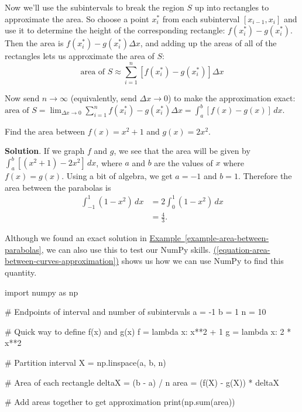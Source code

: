 \documentclass[10pt,]{book}
\theoremstyle{ptxplainnotitle}
\theoremstyle{ptxplaintitle}
\theoremstyle{ptxplainnotitle}
\theoremstyle{ptxplaintitle}
\theoremstyle{ptxplainnotitle}
\theoremstyle{ptxplaintitle}
\theoremstyle{ptxdefinitionnotitle}
\theoremstyle{ptxdefinitiontitle}
\theoremstyle{ptxdefinitionnotitle}
\theoremstyle{ptxdefinitiontitle}
\theoremstyle{ptxdefinitionnotitle}
\theoremstyle{ptxdefinitiontitle}
\theoremstyle{ptxdefinitionnotitle}
\theoremstyle{ptxdefinitiontitle}
\theoremstyle{ptxdefinitionnotitle}
\theoremstyle{ptxdefinitiontitle}
\numberwithin{equation}{section}
\begin{document}
\hypertarget{p-615}{}%
Now we'll use the subintervals to break the region \(S\) up into rectangles to approximate the area. So choose a point \(x_{i}^{*}\) from each subinterval \([x_{i-1}, x_{i}]\) and use it to determine the height of the corresponding rectangle: \(f(x_{i}^{*}) - g(x_{i}^{*})\). Then the area is \(f(x_{i}^{*}) - g(x_{i}^{*})\Delta x\), and adding up the areas of all of the rectangles lets us approximate the area of \(S\):%
\begin{equation}
\text{area of }S \approx \sum_{i=1}^{n}[f(x_{i}^{*}) - g(x_{i}^{*})]\Delta x\label{equation-area-between-curves-approximation}
\end{equation}
%
\par
\hypertarget{p-616}{}%
Now send \(n\to\infty\) (equivalently, send \(\Delta x\to 0\)) to make the approximation exact: \(\text{area of }S = \lim_{\Delta x\to0}\sum_{i=1}^{n}f(x_{i}^{*}) - g(x_{i}^{*})\Delta x = \int_{a}^{b}[f(x) - g(x)]\,dx.\)%
\begin{example}\label{example-area-between-parabolas}
\hypertarget{p-617}{}%
Find the area between \(f(x) = x^{2} + 1\) and \(g(x) = 2x^{2}\).%
\par\smallskip%
\noindent\textbf{Solution}.\hypertarget{solution-134}{}\quad%
\hypertarget{p-618}{}%
If we graph \(f\) and \(g\), we see that the area will be given by \(\int_{a}^{b}[(x^{2} + 1) - 2x^{2}]\,dx\), where \(a\) and \(b\) are the values of \(x\) where \(f(x) = g(x)\). Using a bit of algebra, we get \(a = -1\) and \(b = 1\). Therefore the area between the parabolas is%
\begin{align*}
\int_{-1}^{1}(1 - x^{2})\,dx & = 2\int_{0}^{1}(1-x^{2})\,dx \\
& = \frac{4}{3}. 
\end{align*}
%
\end{example}
\hypertarget{p-619}{}%
Although we found an exact solution in \hyperref[example-area-between-parabolas]{Example~\ref{example-area-between-parabolas}}, we can also use this to test our NumPy skills. \hyperref[equation-area-between-curves-approximation]{(\ref{equation-area-between-curves-approximation})} shows us how we can use NumPy to find this quantity.%
\begin{sageinput}
import numpy as np

# Endpoints of interval and number of subintervals
a = -1
b = 1
n = 10

# Quick way to define f(x) and g(x)
f = lambda x: x**2 + 1
g = lambda x: 2 * x**2

# Partition interval
X = np.linspace(a, b, n)

# Area of each rectangle
deltaX = (b - a) / n
area = (f(X) - g(X)) * deltaX

# Add areas together to get approximation
print(np.sum(area))
\end{sageinput}
\end{document}

